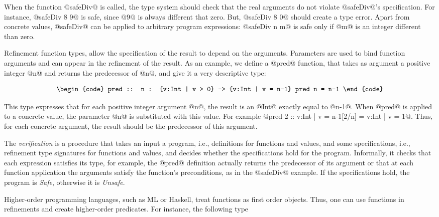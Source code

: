 When the function @safeDiv@ is called, 
the type system should check that the real arguments do not
violate @safeDiv@'s specification.
%
For instance, 
@safeDiv 8 9@ is safe, since @9@ is always different that zero.
But, @safeDiv 8 0@ should create a type error.
Apart from concrete values, @safeDiv@ can be applied to arbitrary program expressions:
@safeDiv n m@ is safe only if 
@m@ is an integer different than zero.

Refinement function types, allow the specification of the 
result to depend on the arguments.
%
Parameters are used to bind function arguments
and can appear in the refinement of the result.
%
As an example, we define a @pred@ function, 
that takes as argument a positive integer @n@ and returns the predecessor of @n@,
and give it a very descriptive type:

$$\centering\begin{tabular}{c}\begin{code}
pred :: n : {v:Int | v > 0} -> {v:Int | v = n-1}
pred n = n-1
\end{code}\end{tabular}$$

This type expresses that for each positive integer argument @n@, 
the result is an @Int@ exactly equal to @n-1@.
When @pred@ is applied to a concrete value, 
the parameter @n@ is substituted with this value.
For example @pred 2 :: {v:Int | v = n-1}[2/n] = {v:Int | v = 1}@.
Thus, for each concrete argument, the result should be the predecessor 
of this argument.

The \textit{verification} is a procedure that takes an input 
a program, i.e.,  definitions for functions and values,
and some specifications, i.e., refinement type signatures for functions and values,
and decides whether the specifications hold for the program.
%
Informally, it checks that 
each expression satisfies its type, 
for example, the @pred@ definition actually returns the 
predecessor of its argument
or that 
at each function application the arguments satisfy
the function's preconditions, 
as in the @safeDiv@ example.
%
If the specifications hold, the program is \textit{Safe}, 
otherwise it is \textit{Unsafe}. 

Higher-order programming languages, such as ML or Haskell, 
treat functions as first order objects.
Thus, one can use functions in refinements and 
create higher-order predicates. 
For instance, the following type

